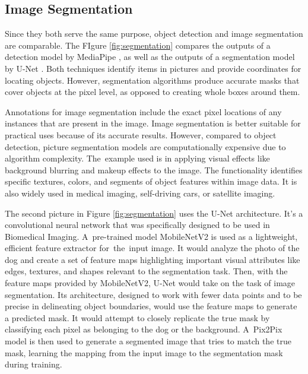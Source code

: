 \subsection{Image Segmentation}

Since they both serve the same purpose, object detection and image segmentation are comparable. The FIgure \ref{fig:segmentation} compares the outputs of a detection model by MediaPipe \cite{mediapipePoseLandmarker}, as well as the outputs of a segmentation model by U-Net \cite{ronneberger2015u}. Both techniques identify items in pictures and provide coordinates for locating objects. However, segmentation algorithms produce accurate masks that cover objects at the pixel level, as opposed to creating whole boxes around them.

Annotations for image segmentation include the exact pixel locations of any instances that are present in the image. Image segmentation is better suitable for practical uses because of its accurate results. However, compared to object detection, picture segmentation models are computationally expensive due to algorithm complexity.
The~example used is in applying visual effects like background blurring and makeup effects to the image. The functionality identifies specific textures, colors, and segments of object features within image data. It is also widely used in medical imaging, self-driving cars, or satellite imaging.

The second picture in Figure \ref{fig:segmentation} uses the U-Net architecture. It's a convolutional neural network that was specifically designed to be used in Biomedical Imaging. A~pre-trained model MobileNetV2 \cite{sandler2018mobilenetv2} is used as a lightweight, efficient feature extractor for~the~input image. It would analyze the photo of the dog and create a set of feature maps highlighting important visual attributes like edges, textures, and shapes relevant to the segmentation task. Then, with the feature maps provided by MobileNetV2, U-Net would take on the task of image segmentation. Its architecture, designed to work with fewer data points and to be precise in delineating object boundaries, would use the feature maps to generate a predicted mask. It would attempt to closely replicate the true mask by classifying each pixel as belonging to the dog or the background. A~Pix2Pix \cite{isola2017image} model is then used to generate a segmented image that tries to match the true mask, learning the mapping from the input image to the segmentation mask during training.


